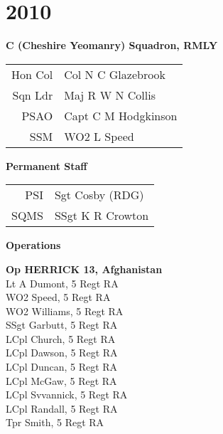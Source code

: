 \chapter*{2010}

\vspace*{20mm}

\begin{center}
  \Large
  \textbf{C (Cheshire Yeomanry) Squadron, RMLY}
\end{center}

\begin{center}
  \begin{tabular}{rl}
    Hon Col & Col N C Glazebrook \\
    Sqn Ldr & Maj R W N Collis \\
    PSAO & Capt C M Hodgkinson \\
    SSM & WO2 L Speed \\
  \end{tabular}
\end{center}

\vspace*{10mm}

\begin{center}
  \Large
  \textbf{Permanent Staff}
\end{center}

\begin{center}
  \begin{tabular}{rl}
    PSI & Sgt Cosby (RDG) \\
    SQMS & SSgt K R Crowton \\
  \end{tabular}
\end{center}

\vspace*{10mm}

\begin{center}
  \Large
  \textbf{Operations}
\end{center}

\begin{multicols}{2}
  \noindent
  \textbf{Op HERRICK 13, Afghanistan} \\
  Lt A Dumont, 5 Regt RA \\
  WO2 Speed, 5 Regt RA \\
  WO2 Williams, 5 Regt RA \\
  SSgt Garbutt, 5 Regt RA \\
  LCpl Church, 5 Regt RA \\
  LCpl Dawson, 5 Regt RA \\
  LCpl Duncan, 5 Regt RA \\
  LCpl McGaw, 5 Regt RA \\
  LCpl Svvannick, 5 Regt RA \\
  LCpl Randall, 5 Regt RA \\
  Tpr Smith, 5 Regt RA \\
\end{multicols}

